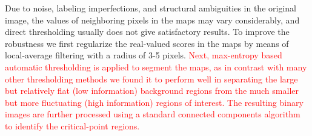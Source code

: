 \documentclass[twocolumn,natbib]{svjour3}
\newcommand{\marked}[1]{\textcolor{red}{#1}}
\begin{document}
Due to noise, labeling imperfections, and structural ambiguities in the original image, the values of neighboring pixels in the maps may vary considerably, and direct thresholding usually does not give satisfactory results. To improve the robustness we first regularize the real-valued scores in the maps by means of local-average filtering with a radius of 3-5 pixels. \marked{Next, max-entropy based automatic thresholding \citep{kapur1985new} is applied to segment the maps, as in contrast with many other thresholding methods we found it to perform well in separating the large but relatively flat (low information) background regions from the much smaller but more fluctuating (high information) regions of interest. The resulting binary images are further processed using a standard connected components algorithm \citep{Sonka-2007} to identify the critical-point regions.}
\end{document}
